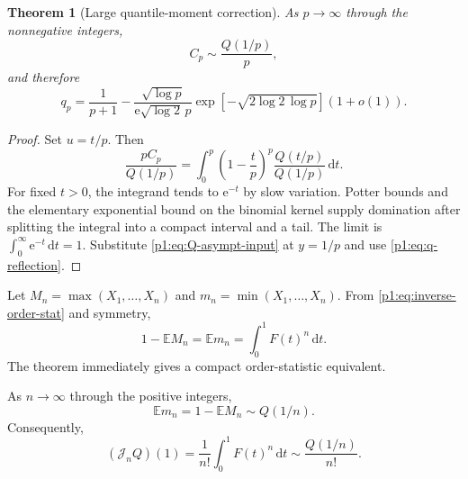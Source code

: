 \documentclass[11pt,oneside]{article}
\newtheorem{theorem}{Theorem}[section]
\theoremstyle{definition}
\theoremstyle{remark}
\newcommand{\E}{\mathbb E}
\newcommand{\dd}{\,\mathrm d}
\newcommand{\e}{\mathrm e}
\newcommand{\Jn}{\mathcal J}
\newcommand{\1}{\mathbf 1}
\begin{document}
\begin{theorem}[Large quantile-moment correction]\label{p1:thm:large-quantile}
As \(p\to\infty\) through the nonnegative integers,
\begin{equation}
 C_p\sim\frac{Q(1/p)}p,                                       \label{p1:eq:Cp-asympt}
\end{equation}
and therefore
\begin{equation}
 \boxed{\quad
 q_p=\frac1{p+1}
 -\frac{\sqrt{\log p}}{\e\sqrt{\log2}\,p}
 \exp\!\left[-\sqrt{2\log2\,\log p}\right](1+o(1)).
 \quad}                                                        \label{p1:eq:qp-asympt}
\end{equation}
\end{theorem}

\begin{proof}
Set \(u=t/p\).  Then
\[
 \frac{pC_p}{Q(1/p)}
 =\int_0^p\left(1-\frac tp\right)^p
 \frac{Q(t/p)}{Q(1/p)}\dd t.
\]
For fixed \(t>0\), the integrand tends to \(\e^{-t}\) by slow variation.
Potter bounds and the elementary exponential bound on the binomial kernel
supply domination after splitting the integral into a compact interval and a
tail.  The limit is \(\int_0^\infty\e^{-t}\dd t=1\).  Substitute
\eqref{p1:eq:Q-asympt-input} at \(y=1/p\) and use
\eqref{p1:eq:q-reflection}.
\end{proof}

Let \(M_n=\max(X_1,\ldots,X_n)\) and
\(m_n=\min(X_1,\ldots,X_n)\).  From
\eqref{p1:eq:inverse-order-stat} and symmetry,
\begin{equation}
 1-\E M_n=\E m_n=\int_0^1F(t)^n\dd t.                           \label{p1:eq:order-stat-id}
\end{equation}
The theorem immediately gives a compact order-statistic equivalent.

\begin{corollary}\label{p1:cor:extreme-order}
As \(n\to\infty\) through the positive integers,
\begin{equation}
 \boxed{\quad
 \E m_n=1-\E M_n\sim Q(1/n).
 \quad}                                                        \label{p1:eq:extreme-order-asympt}
\end{equation}
Consequently,
\begin{equation}
 (\Jn_nQ)(1)=\frac1{n!}\int_0^1F(t)^n\dd t
 \sim\frac{Q(1/n)}{n!}.                                       \label{p1:eq:high-inverse-order}
\end{equation}
\end{corollary}
\end{document}
